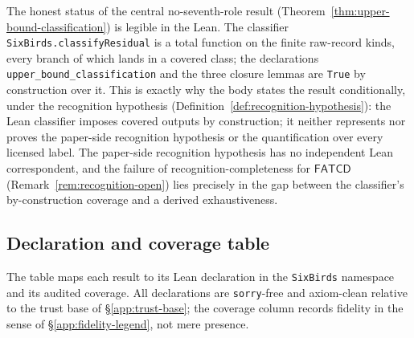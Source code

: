 \documentclass[11pt]{article}
\theoremstyle{definition}
\newcommand{\FATCD}{\ensuremath{\mathsf{FATCD}}}
\begin{document}
The honest status of the central no-seventh-role result
(Theorem~\ref{thm:upper-bound-classification}) is legible in the Lean. The
classifier \texttt{SixBirds.classifyResidual} is a total function on the finite
raw-record kinds, every branch of which lands in a covered class; the
declarations \texttt{upper\_bound\_classification} and the three closure lemmas
are \texttt{True} by construction over it. This is exactly why the body states
the result conditionally, under the recognition hypothesis
(Definition~\ref{def:recognition-hypothesis}): the Lean classifier imposes
covered outputs by construction; it neither represents nor proves the
paper-side recognition hypothesis or the quantification over every licensed
label. The
paper-side recognition hypothesis has no independent Lean correspondent, and the
failure of recognition-completeness for \FATCD{}
(Remark~\ref{rem:recognition-open}) lies precisely in the gap between the classifier's by-construction coverage and a derived
exhaustiveness.

\subsection{Declaration and coverage table}\label{app:table}

The table maps each result to its Lean declaration in the \texttt{SixBirds}
namespace and its audited coverage. All declarations are \texttt{sorry}-free and
axiom-clean relative to the trust base of \S\ref{app:trust-base}; the coverage
column records fidelity in the sense of \S\ref{app:fidelity-legend}, not mere
presence.
\end{document}
